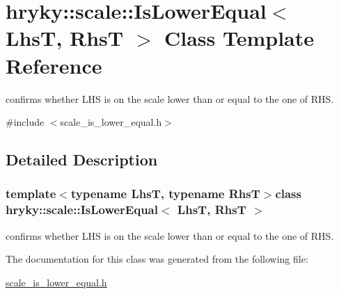 \hypertarget{classhryky_1_1scale_1_1_is_lower_equal}{\section{hryky\-:\-:scale\-:\-:Is\-Lower\-Equal$<$ Lhs\-T, Rhs\-T $>$ Class Template Reference}
\label{classhryky_1_1scale_1_1_is_lower_equal}
}


confirms whether L\-H\-S is on the scale lower than or equal to the one of R\-H\-S.  




{\ttfamily \#include $<$scale\-\_\-is\-\_\-lower\-\_\-equal.\-h$>$}



\subsection{Detailed Description}
\subsubsection*{template$<$typename Lhs\-T, typename Rhs\-T$>$class hryky\-::scale\-::\-Is\-Lower\-Equal$<$ Lhs\-T, Rhs\-T $>$}

confirms whether L\-H\-S is on the scale lower than or equal to the one of R\-H\-S. 

The documentation for this class was generated from the following file\-:\begin{DoxyCompactItemize}
\item 
\hyperlink{scale__is__lower__equal_8h}{scale\-\_\-is\-\_\-lower\-\_\-equal.\-h}\end{DoxyCompactItemize}
